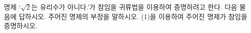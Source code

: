 명제 ‘$\sqrt{2}$는 유리수가 아니다.’가 참임을 귀류법을 이용하여 증명하려고 한다. 다음 물음에 답하시오.
 주어진 명제의 부정을 말하시오.
 (1)을 이용하여 주어진 명제가 참임을 증명하시오.
